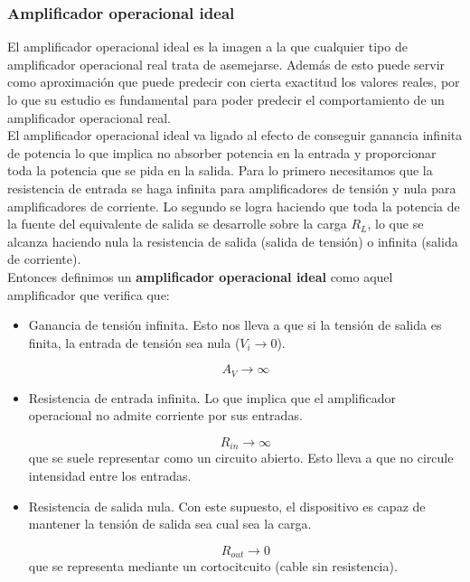 \documentclass[12pt,a4paper]{article}
\numberwithin{equation}{section}
\numberwithin{figure}{section}
\begin{document}
\subsubsection{Amplificador operacional ideal}
El amplificador operacional ideal es la imagen a la que cualquier tipo de amplificador operacional real trata de asemejarse. Además de esto puede servir como aproximación que puede predecir con cierta exactitud los valores reales, por lo que su estudio es fundamental para poder predecir el comportamiento de un amplificador operacional real. \\

El amplificador operacional ideal va ligado al efecto de conseguir ganancia infinita de potencia lo que implica no absorber potencia en la entrada y proporcionar toda la potencia que se pida en la salida. Para lo primero necesitamos que la resistencia de entrada se haga infinita para amplificadores de tensión y nula para amplificadores de corriente. Lo segundo se logra haciendo que toda la potencia de la fuente del equivalente de salida se desarrolle sobre la carga $R_L$, lo que se alcanza haciendo nula la resistencia de salida (salida de tensión) o infinita (salida de corriente). \\

Entonces definimos un \textbf{amplificador operacional ideal} como aquel amplificador que verifica que:

\begin{itemize}
\item Ganancia de tensión infinita. Esto nos lleva a que si la tensión de salida es finita, la entrada de tensión sea nula ($V_i \rightarrow 0$).

$$ A_V \rightarrow \infty $$

\item Resistencia de entrada infinita. Lo que implica que el amplificador operacional no admite corriente por sus entradas.

$$ R_{in} \rightarrow \infty $$
que se suele representar como un circuito abierto. Esto lleva a que no circule intensidad entre los entradas.

\item Resistencia de salida nula. Con este supuesto, el dispositivo es capaz de mantener la tensión de salida sea cual sea la carga.

$$ R_{out} \rightarrow 0 $$
que se representa mediante un cortocitcuito (cable sin resistencia).


\end{itemize}
\end{document}
